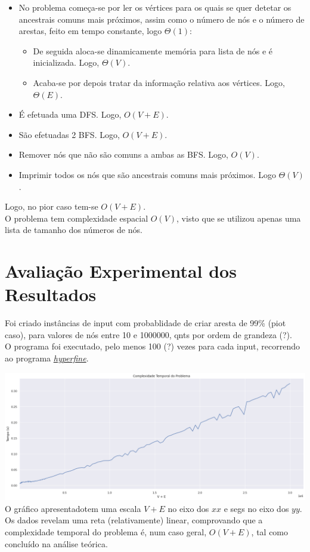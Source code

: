 \documentclass[12pt,a4paper]{article}
\begin{document}
  \begin{itemize}
    \setlength{\itemsep}{0pt}
    \item No problema começa-se por ler os vértices para os quais se quer detetar os ancestrais comuns mais próximos, assim como o número de nós e o número de arestas, feito em tempo constante, logo $\Theta(1)$:
    \begin{itemize}
      \setlength{\itemsep}{0pt}
      \item De seguida aloca-se dinamicamente memória para lista de nós e é inicializada. Logo, $\Theta(V)$.
      \item Acaba-se por depois tratar da informação relativa aos vértices. Logo, $\Theta(E)$.
    \end{itemize}

   \item É efetuada uma DFS. Logo, $O(V + E)$.

  \item São efetuadas 2 BFS. Logo, $O(V + E)$.

  \item Remover nós que não são comuns a ambas as BFS. Logo, $O(V)$.

  \item Imprimir todos os nós que são ancestrais comuns mais próximos. Logo $\Theta(V)$.
  \end{itemize}
  Logo, no pior caso tem-se $O(V + E)$.\\
  O problema tem complexidade espacial $O(V)$, visto que se utilizou apenas uma lista de tamanho dos números de nós.

  \section{Avaliação Experimental dos Resultados}

  Foi criado instâncias de input com probablidade de criar aresta de 99\% (piot caso), para valores de nós entre 10 e 1000000, qnts por ordem de grandeza (?).\\
  O programa foi executado, pelo menos 100 (?) vezes para cada input, recorrendo ao programa \href{https://github.com/sharkdp/hyperfine}{\textit{hyperfine}}.
    
  \includegraphics[width=1\textwidth]{report.png}
  O gráfico apresentadotem uma escala $V + E$ no eixo dos $xx$ e segs no eixo dos $yy$.\\
  Os dados revelam uma reta (relativamente) linear, comprovando que a complexidade temporal do problema é, num caso geral, $O(V + E)$, tal como concluído na análise teórica.
\end{document}
